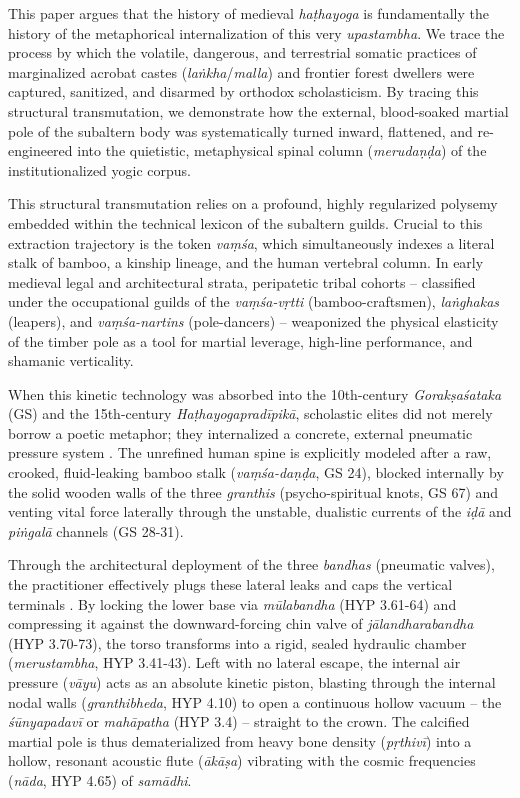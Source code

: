 \documentclass[11pt,twoside,letterpaper]{article}
\begin{document}
This paper argues that the history of medieval \textit{haṭhayoga} is fundamentally the history of the metaphorical internalization of this very \textit{upastambha}. We trace the process by which the volatile, dangerous, and terrestrial somatic practices of marginalized acrobat castes (\textit{la\.{n}kha}/\textit{malla}) and frontier forest dwellers were captured, sanitized, and disarmed by orthodox scholasticism. By tracing this structural transmutation, we demonstrate how the external, blood-soaked martial pole of the subaltern body was systematically turned inward, flattened, and re-engineered into the quietistic, metaphysical spinal column (\textit{merudaṇḍa}) of the institutionalized yogic corpus.

This structural transmutation relies on a profound, highly regularized polysemy embedded within the technical lexicon of the subaltern guilds. Crucial to this extraction trajectory is the token \textit{vaṃśa}, which simultaneously indexes a literal stalk of bamboo, a kinship lineage, and the human vertebral column. In early medieval legal and architectural strata, peripatetic tribal cohorts -- classified under the occupational guilds of the \textit{vaṃśa-vṛtti} (bamboo-craftsmen), \textit{la\.{n}ghakas} (leapers), and \textit{vaṃśa-nartins} (pole-dancers) -- weaponized the physical elasticity of the timber pole as a tool for martial leverage, high-line performance, and shamanic verticality. 

When this kinetic technology was absorbed into the 10th-century \textit{Gorakṣaśataka} (GS) and the 15th-century \textit{Haṭhayogapradīpikā}, scholastic elites did not merely borrow a poetic metaphor; they internalized a concrete, external pneumatic pressure system \citep{Mallinson2020, Swatmarama2024}. The unrefined human spine is explicitly modeled after a raw, crooked, fluid-leaking bamboo stalk (\textit{vaṃśa-daṇḍa}, GS 24), blocked internally by the solid wooden walls of the three \textit{granthis} (psycho-spiritual knots, GS 67) and venting vital force laterally through the unstable, dualistic currents of the \textit{iḍā} and \textit{piṅgalā} channels (GS 28-31).

Through the architectural deployment of the three \textit{bandhas} (pneumatic valves), the practitioner effectively plugs these lateral leaks and caps the vertical terminals \citep{Swatmarama2024}. By locking the lower base via \textit{mūlabandha} (HYP 3.61-64) and compressing it against the downward-forcing chin valve of \textit{jālandharabandha} (HYP 3.70-73), the torso transforms into a rigid, sealed hydraulic chamber (\textit{merustambha}, HYP 3.41-43). Left with no lateral escape, the internal air pressure (\textit{vāyu}) acts as an absolute kinetic piston, blasting through the internal nodal walls (\textit{granthibheda}, HYP 4.10) to open a continuous hollow vacuum -- the \textit{śūnyapadavī} or \textit{mahāpatha} (HYP 3.4) -- straight to the crown. The calcified martial pole is thus dematerialized from heavy bone density (\textit{pṛthivī}) into a hollow, resonant acoustic flute (\textit{ākāṣa}) vibrating with the cosmic frequencies (\textit{nāda}, HYP 4.65) of \textit{samādhi}.
\end{document}
